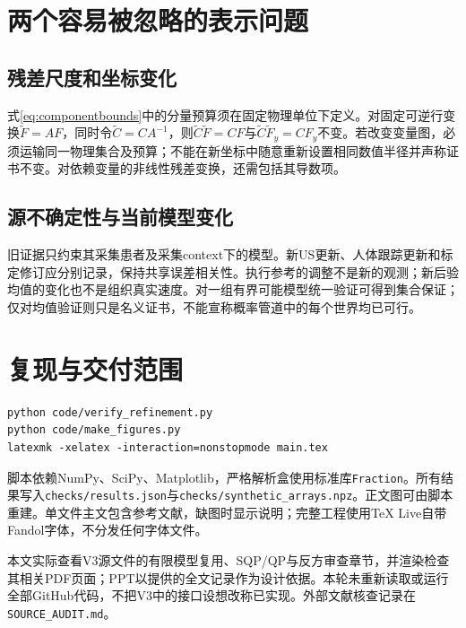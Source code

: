 \documentclass[UTF8,11pt,a4paper,fontset=fandol]{ctexart}
\numberwithin{equation}{section}
\theoremstyle{definition}
\begin{document}
\appendix
\section{两个容易被忽略的表示问题}
\subsection{残差尺度和坐标变化}
式\eqref{eq:componentbounds}中的分量预算须在固定物理单位下定义。对固定可逆行变换$\widetilde F=AF$，同时令$\widetilde C=CA^{-1}$，则$\widetilde C\widetilde F=CF$与$\widetilde C\widetilde F_y=CF_y$不变。若改变变量图，必须运输同一物理集合及预算；不能在新坐标中随意重新设置相同数值半径并声称证书不变。对依赖变量的非线性残差变换，还需包括其导数项。

\subsection{源不确定性与当前模型变化}
旧证据只约束其采集患者及采集context下的模型。新US更新、人体跟踪更新和标定修订应分别记录，保持共享误差相关性。执行参考的调整不是新的观测；新后验均值的变化也不是组织真实速度。对一组有界可能模型统一验证可得到集合保证；仅对均值验证则只是名义证书，不能宣称概率管道中的每个世界均已可行。

\section{复现与交付范围}
\begin{verbatim}
python code/verify_refinement.py
python code/make_figures.py
latexmk -xelatex -interaction=nonstopmode main.tex
\end{verbatim}
脚本依赖NumPy、SciPy、Matplotlib，严格解析盒使用标准库\texttt{Fraction}。所有结果写入\texttt{checks/results.json}与\texttt{checks/synthetic\_arrays.npz}。正文图可由脚本重建。单文件主文包含参考文献，缺图时显示说明；完整工程使用TeX Live自带Fandol字体，不分发任何字体文件。

本文实际查看V3源文件的有限模型复用、SQP/QP与反方审查章节，并渲染检查其相关PDF页面；PPT以提供的全文记录作为设计依据。本轮未重新读取或运行全部GitHub代码，不把V3中的接口设想改称已实现。外部文献核查记录在\texttt{SOURCE\_AUDIT.md}。
\end{document}
